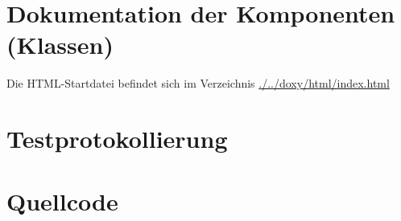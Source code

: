 \section{Dokumentation der Komponenten (Klassen)}

Die HTML-Startdatei befindet sich im Verzeichnis \href{run:./../doxy/html/index.html}{./../doxy/html/index.html}

\section{Testprotokollierung}

\section{Quellcode}


